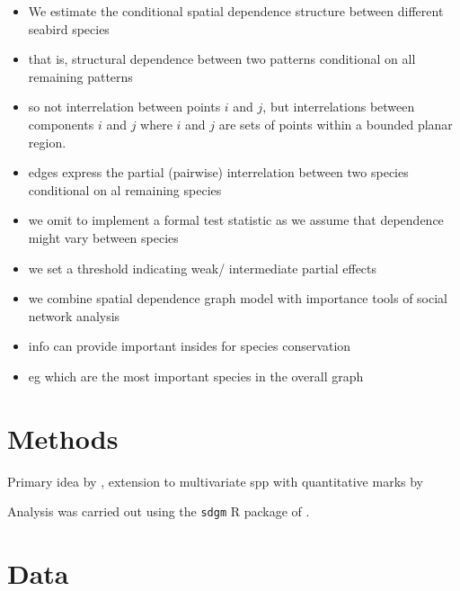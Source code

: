 \documentclass{statsoc}\usepackage[]{graphicx}\usepackage[]{color}
\begin{document}
\begin{itemize}
\item We estimate the conditional spatial dependence structure between different seabird species
\item that is, structural dependence between two patterns conditional on all remaining patterns
\item so not interrelation between points $i$ and $j$, but interrelations between components $i$ and $j$ where $i$ and $j$ are sets of points within a bounded planar region.
\item edges express the partial (pairwise) interrelation between two species conditional on al remaining species
\item we omit to implement a formal test statistic as we assume that dependence might vary between species
\item we set a threshold indicating weak/ intermediate partial effects
\item we combine spatial dependence graph model with importance tools of social network analysis
\item info can provide important insides for species conservation
\item eg which are the most important species in the overall graph
\end{itemize}

\section{Methods}

Primary idea by \cite{Eckardt2016}, extension to multivariate spp with quantitative marks by \cite{Eckardt2016b}

Analysis was carried out using the \texttt{sdgm} R package of \cite{Eckardt2016a}.

\section{Data}
\end{document}
